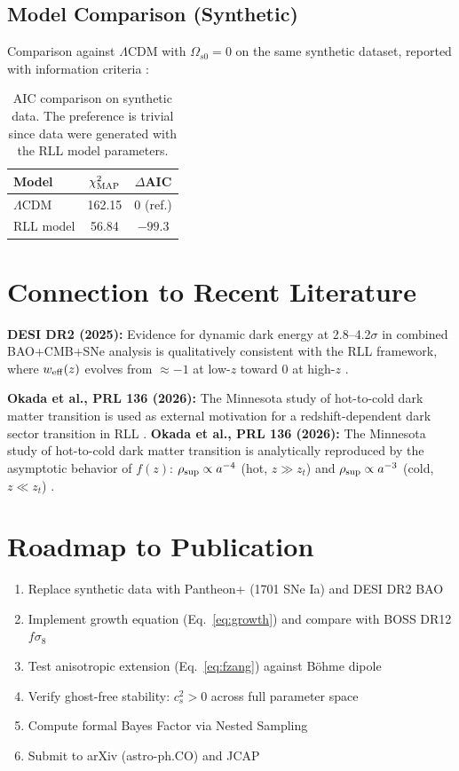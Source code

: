 \documentclass[11pt,a4paper]{article}
\begin{document}
\subsection{Model Comparison (Synthetic)}

Comparison against $\Lambda$CDM with $\Omega_{s0}=0$ on the same synthetic dataset, reported with information criteria \cite{akaike1974,schwarz1978}:

\begin{table}[h]
\centering
\begin{tabular}{lcc}
\toprule
Model & $\chi^2_{\rm MAP}$ & $\Delta$AIC \\
\midrule
$\Lambda$CDM & 162.15 & 0 (ref.) \\
RLL model    & 56.84  & $-99.3$ \\
\bottomrule
\end{tabular}
\caption{AIC comparison on synthetic data. The preference is trivial since data were generated with the RLL model parameters.}
\end{table}

\section{Connection to Recent Literature}

\textbf{DESI DR2 (2025):} Evidence for dynamic dark energy at 2.8–4.2$\sigma$ in combined BAO+CMB+SNe analysis is qualitatively consistent with the RLL framework, where $w_{\rm eff}(z)$ evolves from $\approx -1$ at low-$z$ toward 0 at high-$z$ \cite{desi2025}.

\textbf{Okada et al., PRL 136 (2026):} The Minnesota study of hot-to-cold dark matter transition is used as external motivation for a redshift-dependent dark sector transition in RLL \cite{okada2026}.
\textbf{Okada et al., PRL 136 (2026):} The Minnesota study of hot-to-cold dark matter transition is analytically reproduced by the asymptotic behavior of $f(z)$: $\rho_{\rm sup} \propto a^{-4}$ (hot, $z\gg z_t$) and $\rho_{\rm sup} \propto a^{-3}$ (cold, $z\ll z_t$) \cite{okada2026}.

\section{Roadmap to Publication}

\begin{enumerate}
  \item Replace synthetic data with Pantheon+ (1701 SNe Ia) and DESI DR2 BAO \cite{pantheon,desi2025}
  \item Implement growth equation (Eq.~\ref{eq:growth}) and compare with BOSS DR12 $f\sigma_8$
  \item Test anisotropic extension (Eq.~\ref{eq:fzang}) against Böhme dipole \cite{bohme2025}
  \item Verify ghost-free stability: $c_s^2 > 0$ across full parameter space
  \item Compute formal Bayes Factor via Nested Sampling
  \item Submit to arXiv (astro-ph.CO) and JCAP
\end{enumerate}
\end{document}
